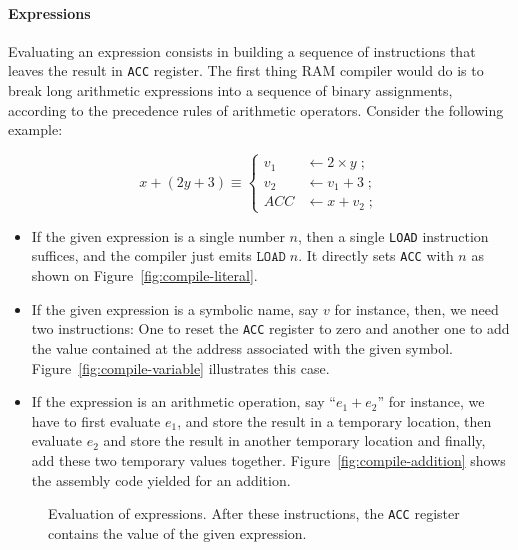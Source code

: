 \documentclass {aldast}
\begin{document}
\paragraph{Expressions} Evaluating an expression consists in building
a sequence of instructions that leaves the result in \texttt{ACC}
register. The first thing RAM compiler would do is to break long
arithmetic expressions into a sequence of binary assignments, according to the
precedence rules of arithmetic operators. Consider the following
example:

\begin{equation}
  x + (2y + 3) \equiv \left\{
    \begin{array}{rl}
      v_1 & \gets 2 \times y \; ; \\
      v_2 & \gets v_1 + 3 \; ; \\
      \mathit{ACC} & \gets x + v_2 \; ;
    \end{array} \right.
\end{equation}

\begin{itemize}
\item If the given expression is a single number $n$, then a
 single \texttt{LOAD} instruction suffices, and the compiler just emits
  $\mathtt{LOAD} \; n$. It directly sets \texttt{ACC} with $n$ as
  shown on Figure~\ref{fig:compile-literal}.
\item If the given expression is a symbolic name, say $v$ for
  instance, then, we need two instructions: One to reset the
  \texttt{ACC} register to zero and another one to add the value
  contained at the address associated with the given
  symbol. Figure~\ref{fig:compile-variable} illustrates this case.
\item If the expression is an arithmetic operation, say
  ``$e_1 + e_2$'' for instance, we have to first evaluate $e_1$, and
  store the result in a temporary location, then evaluate $e_2$ and
  store the result in another temporary location and finally, add
  these two temporary values
  together. Figure~\ref{fig:compile-addition} shows the assembly code
  yielded for an addition.
\end{itemize}


\begin{figure}
    \centering
    \qquad
    \qquad
    \subfloat[Expression $e_1 + e_2$]{
      
      \label{fig:compile-addition}
    }
    \caption{Evaluation of expressions. After these instructions, the
      \texttt{ACC} register contains the value of the given
      expression.}
    \label{fig:compile-expressions}
\end{figure}
\end{document}
